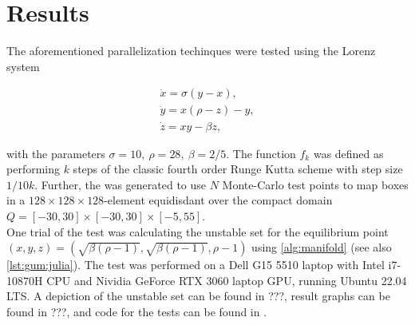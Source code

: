 
\section{Results}

The aforementioned parallelization techinques were tested using the Lorenz system 
\cite*{lorenz}

\begin{gather}
    \dot{x} = \sigma (y - x), \\
    \dot{y} = x (\rho - z) - y, \\
    \dot{z} = xy - \beta z,
\end{gather}

with the parameters $\sigma = 10,\ \rho = 28,\ \beta = 2 / 5$. The function $f_k$ was 
defined as performing $k$ steps of the classic fourth order Runge Kutta scheme with step 
size $1 / 10 k$. Further, the   was generated to use $N$
Monte-Carlo test points to map boxes in a $128 \times 128 \times 128$-element equidisdant 
 over the compact domain 
$Q = [-30,30] \times [-30,30] \times [-5,55]$. \\

One trial of the test was calculating the unstable set for the equilibrium point 
$(x, y, z) = (\sqrt{\beta (\rho - 1)}, \sqrt{\beta (\rho - 1)}, \rho - 1)$ using 
\autoref{alg:manifold} (see also \autoref{lst:gum:julia}). The test was performed on a 
Dell G15 5510 laptop with Intel i7-10870H CPU and Nividia GeForce RTX 3060 laptop GPU, 
running Ubuntu 22.04 LTS. A depiction of the unstable set can be found in ???, result 
graphs can be found in ???, and code for the tests can be found in \cite*{benchmarks}. 

